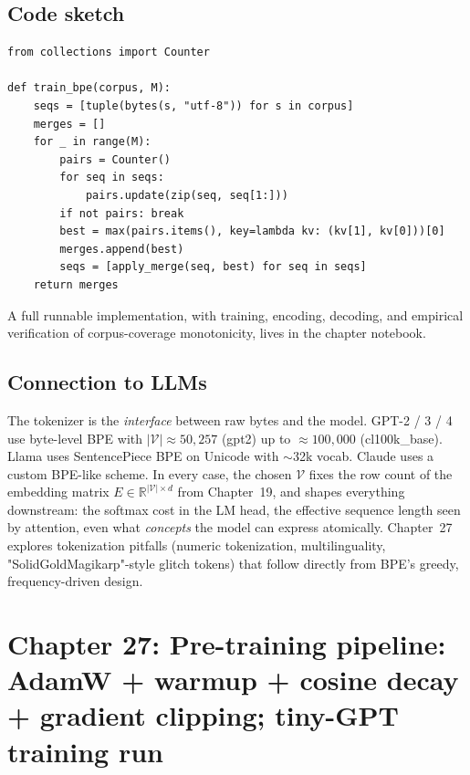 \documentclass[11pt]{article}
\theoremstyle{remark}
\begin{document}
\subsection*{Code sketch}

\begin{verbatim}
from collections import Counter

def train_bpe(corpus, M):
    seqs = [tuple(bytes(s, "utf-8")) for s in corpus]
    merges = []
    for _ in range(M):
        pairs = Counter()
        for seq in seqs:
            pairs.update(zip(seq, seq[1:]))
        if not pairs: break
        best = max(pairs.items(), key=lambda kv: (kv[1], kv[0]))[0]
        merges.append(best)
        seqs = [apply_merge(seq, best) for seq in seqs]
    return merges
\end{verbatim}

A full runnable implementation, with training, encoding, decoding, and empirical verification of corpus-coverage monotonicity, lives in the chapter notebook.

\subsection*{Connection to LLMs}

The tokenizer is the \emph{interface} between raw bytes and the model. GPT-2 / 3 / 4 use byte-level BPE with $|\mathcal{V}| \approx 50{,}257$ (gpt2) up to $\approx 100{,}000$ (cl100k\_base). Llama uses SentencePiece BPE on Unicode with $\sim$32k vocab. Claude uses a custom BPE-like scheme. In every case, the chosen $\mathcal{V}$ fixes the row count of the embedding matrix $E \in \mathbb{R}^{|\mathcal{V}| \times d}$ from Chapter~19, and shapes everything downstream: the softmax cost in the LM head, the effective sequence length seen by attention, even what \emph{concepts} the model can express atomically. Chapter~27 explores tokenization pitfalls (numeric tokenization, multilinguality, "SolidGoldMagikarp"-style glitch tokens) that follow directly from BPE's greedy, frequency-driven design.


\section*{Chapter 27: Pre-training pipeline: AdamW + warmup + cosine decay + gradient clipping; tiny-GPT training run}
\end{document}
